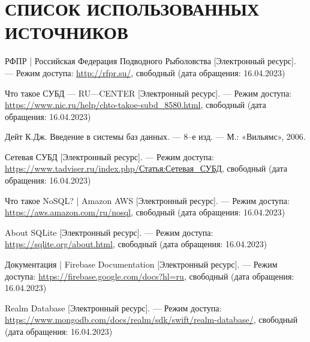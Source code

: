 \section*{СПИСОК ИСПОЛЬЗОВАННЫХ ИСТОЧНИКОВ}

\begingroup
\renewcommand{\section}[2]{}
\begin{thebibliography}{}
	
	РФПР | Российская Федерация Подводного Рыболовства [Электронный ресурс]. --- Режим доступа: \url{http://rfpr.su/}, свободный (дата обращения: 16.04.2023)
	
	Что такое СУБД --- RU---CENTER [Электронный ресурс]. --- Режим доступа: \url{https://www.nic.ru/help/chto-takoe-subd_8580.html}, свободный (дата обращения: 16.04.2023)
	
	Дейт К.Дж. Введение в системы баз данных. --- 8--е изд. --- М.: «Вильямс», 2006.
	
	Сетевая СУБД [Электронный ресурс]. --- Режим доступа: \url{https://www.tadviser.ru/index.php/Статья:Сетевая_СУБД}, свободный (дата обращения: 16.04.2023)
	
	
	
	Что такое NoSQL? | Amazon AWS  [Электронный ресурс]. --- Режим доступа: \url{https://aws.amazon.com/ru/nosql}, свободный (дата обращения: 16.04.2023)
		
	About SQLite  [Электронный ресурс]. --- Режим доступа: \url{https://sqlite.org/about.html}, свободный (дата обращения: 16.04.2023)
	
	Документация | Firebase Documentation [Электронный ресурс]. --- Режим доступа: \url{https://firebase.google.com/docs?hl=ru}, свободный (дата обращения: 16.04.2023)
	
	Realm Database [Электронный ресурс]. --- Режим доступа: \url{https://www.mongodb.com/docs/realm/sdk/swift/realm-database/}, свободный (дата обращения: 16.04.2023)
	

\end{thebibliography}
